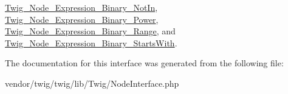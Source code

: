 \hyperlink{classTwig__Node__Expression__Binary__NotIn_a8b6e1b2bac0c28d67a346fb638030d6d}{Twig\+\_\+\+Node\+\_\+\+Expression\+\_\+\+Binary\+\_\+\+Not\+In}, \hyperlink{classTwig__Node__Expression__Binary__Power_ade146298c606f2d202ab22137ca7a266}{Twig\+\_\+\+Node\+\_\+\+Expression\+\_\+\+Binary\+\_\+\+Power}, \hyperlink{classTwig__Node__Expression__Binary__Range_a3ab87f75512383dd78ee56e995329ea4}{Twig\+\_\+\+Node\+\_\+\+Expression\+\_\+\+Binary\+\_\+\+Range}, and \hyperlink{classTwig__Node__Expression__Binary__StartsWith_af72f112bc06d96159eca5c238d90827b}{Twig\+\_\+\+Node\+\_\+\+Expression\+\_\+\+Binary\+\_\+\+Starts\+With}.



The documentation for this interface was generated from the following file\+:\begin{DoxyCompactItemize}
\item 
vendor/twig/twig/lib/\+Twig/Node\+Interface.\+php\end{DoxyCompactItemize}
